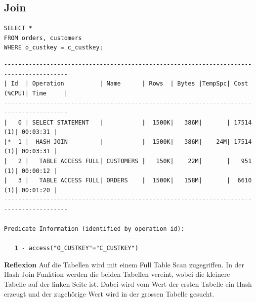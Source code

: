 \documentclass[10pt]{article}
\begin{document}
\subsection{Join}
\begin{lstlisting}[style=sql]
SELECT *
FROM orders, customers
WHERE o_custkey = c_custkey;
\end{lstlisting}
\begin{lstlisting}[style=queryexecutionplan]
----------------------------------------------------------------------------------------
| Id  | Operation          | Name      | Rows  | Bytes |TempSpc| Cost (%CPU)| Time     |
----------------------------------------------------------------------------------------
|   0 | SELECT STATEMENT   |           |  1500K|   386M|       | 17514   (1)| 00:03:31 |
|*  1 |  HASH JOIN         |           |  1500K|   386M|    24M| 17514   (1)| 00:03:31 |
|   2 |   TABLE ACCESS FULL| CUSTOMERS |   150K|    22M|       |   951   (1)| 00:00:12 |
|   3 |   TABLE ACCESS FULL| ORDERS    |  1500K|   158M|       |  6610   (1)| 00:01:20 |
----------------------------------------------------------------------------------------
 
Predicate Information (identified by operation id):
---------------------------------------------------
   1 - access("O_CUSTKEY"="C_CUSTKEY")
\end{lstlisting}
\textbf{Reflexion} \newline
Auf die Tabellen wird mit einem Full Table Scan zugegriffen. In der Hash Join Funktion werden 
die beiden Tabellen vereint, wobei die kleinere Tabelle auf der linken Seite ist. Dabei wird vom Wert der 
ersten Tabelle ein Hash erzeugt und der zugehörige Wert wird in der grossen Tabelle gesucht.
\end{document}
